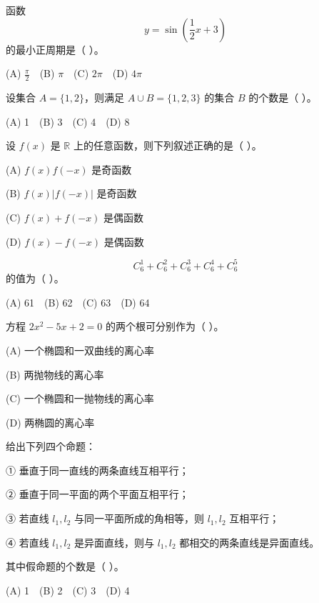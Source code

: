 \begin{question}
函数
\nopagebreak[4]
\[
y=\sin\left(\frac12x+3\right)
\]
的最小正周期是（ ）。

(A) \(\frac{\pi}{2}\)　(B) \(\pi\)　(C) \(2\pi\)　(D) \(4\pi\)

\end{question}
\begin{question}
设集合 \(A=\{1,2\}\)，则满足 \(A\cup B=\{1,2,3\}\) 的集合 \(B\) 的个数是（ ）。

(A) 1　(B) 3　(C) 4　(D) 8

\end{question}
\begin{question}
设 \(f(x)\) 是 \(\mathbb R\) 上的任意函数，则下列叙述正确的是（ ）。

(A) \(f(x)f(-x)\) 是奇函数

(B) \(f(x)|f(-x)|\) 是奇函数

(C) \(f(x)+f(-x)\) 是偶函数

(D) \(f(x)-f(-x)\) 是偶函数

\end{question}
\begin{question}
\nopagebreak[4]
\[
C_6^1+C_6^2+C_6^3+C_6^4+C_6^5
\]
的值为（ ）。

(A) 61　(B) 62　(C) 63　(D) 64

\end{question}
\begin{question}
方程 \(2x^2-5x+2=0\) 的两个根可分别作为（ ）。

(A) 一个椭圆和一双曲线的离心率

(B) 两抛物线的离心率

(C) 一个椭圆和一抛物线的离心率

(D) 两椭圆的离心率

\end{question}
\begin{question}
给出下列四个命题：

① 垂直于同一直线的两条直线互相平行；

② 垂直于同一平面的两个平面互相平行；

③ 若直线 \(l_1,l_2\) 与同一平面所成的角相等，则 \(l_1,l_2\) 互相平行；

④ 若直线 \(l_1,l_2\) 是异面直线，则与 \(l_1,l_2\) 都相交的两条直线是异面直线。

其中假命题的个数是（ ）。

(A) 1　(B) 2　(C) 3　(D) 4

\end{question}
